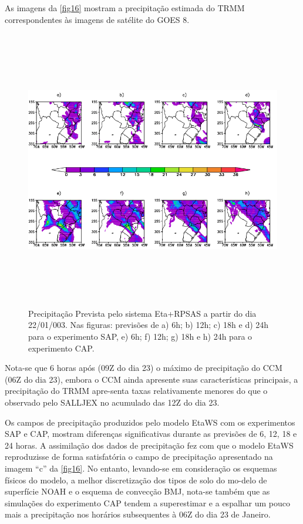 As imagens da \autoref{fig16} mostram a precipitação estimada do TRMM correspondentes às imagens de satélite do GOES 8.

\begin{figure}
\includegraphics[height=12.2cm]{./figs/prec_eta.png}
\caption{Precipitação Prevista pelo sistema Eta+RPSAS a partir do dia 22/01/003. Nas figuras: previsões de a) 6h; b) 12h; c) 18h e d) 24h para o experimento SAP, e) 6h; f) 12h; g) 18h e h) 24h para o experimento CAP.}
\label{fig17}
\end{figure}

Nota-se que 6 horas após (09Z do dia 23) o máximo de precipitação do CCM (06Z do dia 23), embora o CCM ainda apresente suas características principais, a precipitação do TRMM apre-senta taxas relativamente menores do que o observado pelo SALLJEX no acumulado das 12Z do dia 23. 

Os campos de precipitação produzidos pelo modelo EtaWS com os experimentos SAP e CAP, mostram diferenças significativas durante as previsões de 6, 12, 18 e 24 horas. A assimilação dos dados de precipitação fez com que o modelo EtaWS reproduzisse de forma satisfatória o campo de precipitação apresentado na imagem ``c'' da \autoref{fig16}. No entanto, levando-se em consideração os esquemas físicos do modelo,  a melhor discretização dos tipos de solo do mo-delo de superfície NOAH e o esquema de convecção BMJ, nota-se também que as simulações do experimento CAP tendem a superestimar e a espalhar um pouco mais a precipitação nos horários subsequentes à 06Z do dia 23 de Janeiro.

